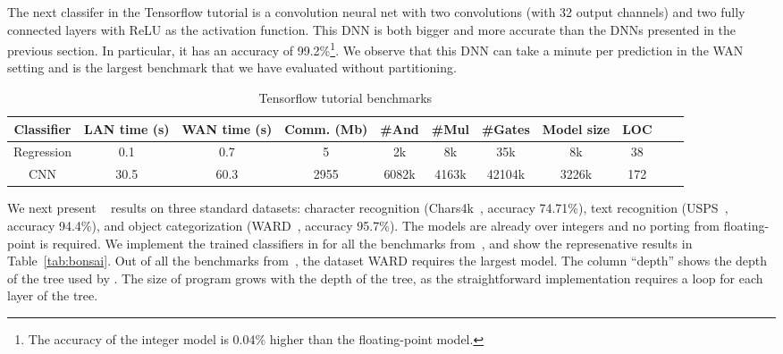 The next classifer in the Tensorflow tutorial is a convolution neural net with two convolutions
(with 32 output channels) and two fully connected layers with ReLU as the activation function.
This DNN is both bigger and more accurate than the DNNs presented in the previous section.
In particular, it has an accuracy of 99.2\%\footnote{The accuracy of
  the integer model is 0.04\% higher than the floating-point
  model.}. 
We observe that this DNN can take a minute per prediction in the WAN
setting and is the largest benchmark that we have evaluated without
partitioning.



\begin{table*}
\begin{tabular}{c|c|c|c |c|c|c|c|c|c | c}
Classifier       & LAN time (s) & WAN time (s) & Comm. (Mb)  & \#And & \#Mul & \#Gates & Model size & LOC\\
\hline
Regression &  0.1         & 0.7         & 5            & 2k    & 8k    &  35k    & 8k   & 38\\
\hline
CNN        &  30.5        & 60.3        & 2955         & 6082k & 4163k &  42104k & 3226k& 172\\
\hline
\end{tabular}

 \caption{Tensorflow tutorial benchmarks}
 \label{tab:tf} 
\end{table*}


We next present \bonsai~\cite{bonsai} results on three
standard datasets: character recognition (Chars4k~\cite{campos},
accuracy 74.71\%), text recognition (USPS~\cite{hull}, accuracy
94.4\%), and object categorization (WARD~\cite{yang}, accuracy
95.7\%). 
The \bonsai models are already over integers and no porting from
floating-point is required.
We implement the trained classifiers in \tool for all the benchmarks
from~\cite{bonsai},
and show the represenative results in Table~\ref{tab:bonsai}.
Out of all the benchmarks from~\cite{bonsai}, the dataset WARD
requires the largest model. 
The column ``depth''  shows the depth of the
tree used by \bonsai. The size of \tool 
program grows with the depth of the tree, as the straightforward \tool
implementation requires a loop for each layer of the
tree. 

